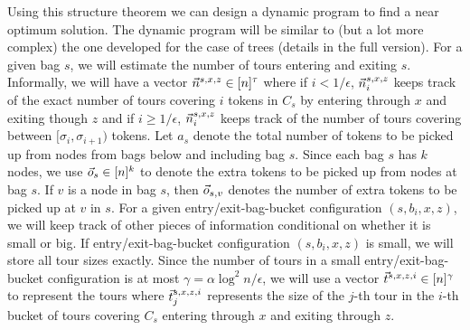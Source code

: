 \documentclass[twoside,leqno]{article}
\newcommand{\eps}{\epsilon}
\begin{document}
Using this structure theorem we can design a dynamic program to find a near optimum
solution. The dynamic program will be similar to (but a lot more complex) the one developed for the case of trees (details in the full version).
For a given bag $s$, we will estimate the number of tours entering and exiting $s$. Informally, we will have a vector $\vec{n}^{s,x,z} \in [n]^\tau$ where if $i < 1/\eps$, $\vec{n}_{i}^{s,x,z}$ keeps track of the exact number of tours covering $i$ tokens in $C_s$ by entering through $x$ and exiting though $z$ and if $i \ge 1/\eps$, $\vec{n}_{i}^{s,x,z}$ keeps track of the number of tours covering between $[\sigma_i, \sigma_{i+1})$ tokens. Let $a_s$ denote the total number of tokens to be picked up from nodes from bags below and including bag $s$. Since each bag $s$ has $k$ nodes, we use $\vec{o}_s \in [n]^{k}$ to denote the extra tokens to be picked up from nodes at bag $s$. If $v$ is a node in bag $s$, then $\vec{o}_{s,v}$ denotes the number of extra tokens to be picked up at $v$ in $s$. For a given entry/exit-bag-bucket configuration $(s,b_i,x,z)$, we will keep track of other pieces of information conditional on whether it is small or big. If entry/exit-bag-bucket configuration $(s,b_i,x,z)$ is small, we will store all tour sizes exactly. Since the number of tours in a small entry/exit-bag-bucket configuration is at most $\gamma = \alpha \log^2n /\eps$, we will use a vector $\vec{t}^{s,x,z,i} \in [n]^\gamma$ to represent the tours where  $\vec{t}^{s,x,z,i}_j$ represents the size of the $j$-th tour in the $i$-th bucket of tours covering $C_s$ entering through $x$ and exiting through $z$. 
\end{document}
